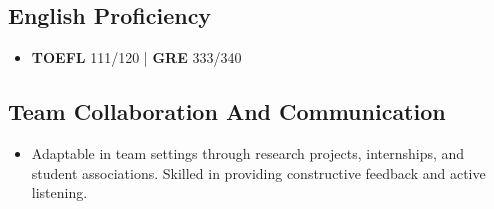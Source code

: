 \documentclass[a4paper]{article}
\begin{document}
\subsection{English Proficiency}
\begin{itemize}
    \item \textbf{TOEFL} 111/120 | \textbf{GRE} 333/340 
\end{itemize}

\subsection{Team Collaboration And Communication}
\begin{itemize}
    \item Adaptable in team settings through research projects, internships, and student associations. Skilled in providing constructive feedback and active listening.
\end{itemize}
\end{document}
